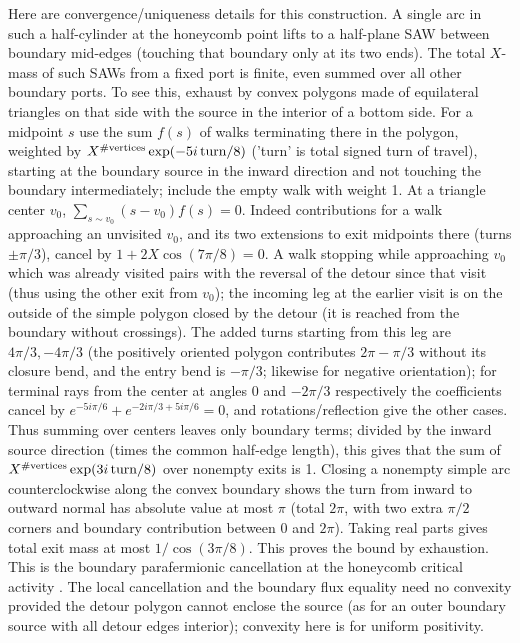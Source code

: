 Here are convergence/uniqueness details for this construction. A single arc in such a half-cylinder at the honeycomb point lifts to a half-plane SAW between boundary mid-edges (touching that boundary only at its two ends). The total \(X\)-mass of such SAWs from a fixed port is finite, even summed over all other boundary ports. To see this, exhaust by convex polygons made of equilateral triangles on that side with the source in the interior of a bottom side. For a midpoint \(s\) use the sum \(f(s)\) of walks terminating there in the polygon, weighted by \(X^{\#\text{vertices}}\exp(-5i\,{\rm turn}/8)\) ('turn' is total signed turn of travel), starting at the boundary source in the inward direction and not touching the boundary intermediately; include the empty walk with weight 1. At a triangle center \(v_0\),
\(\sum_{s\sim v_0}(s-v_0)f(s)=0\).
Indeed contributions for a walk approaching an unvisited \(v_0\), and its two extensions to exit midpoints there (turns \(\pm\pi/3\)), cancel by \(1+2X\cos(7\pi/8)=0\). A walk stopping while approaching \(v_0\) which was already visited pairs with the reversal of the detour since that visit (thus using the other exit from \(v_0\)); the incoming leg at the earlier visit is on the outside of the simple polygon closed by the detour (it is reached from the boundary without crossings). The added turns starting from this leg are \(4\pi/3,-4\pi/3\) (the positively oriented polygon contributes \(2\pi-\pi/3\) without its closure bend, and the entry bend is \(-\pi/3\); likewise for negative orientation); for terminal rays from the center at angles 0 and \(-2\pi/3\) respectively the coefficients cancel by \(e^{-5i\pi/6}+e^{-2i\pi/3+5i\pi/6}=0\), and rotations/reflection give the other cases. Thus summing over centers leaves only boundary terms; divided by the inward source direction (times the common half-edge length), this gives that the sum of \(X^{\#\text{vertices}}\exp(3i\,{\rm turn}/8)\) over nonempty exits is 1. Closing a nonempty simple arc counterclockwise along the convex boundary shows the turn from inward to outward normal has absolute value at most \(\pi\) (total \(2\pi\), with two extra \(\pi/2\) corners and boundary contribution between 0 and \(2\pi\)). Taking real parts gives total exit mass at most \(1/\cos(3\pi/8)\). This proves the bound by exhaustion. This is the boundary parafermionic cancellation at the honeycomb critical activity \cite{DuminilCopinSmirnov2012}. The local cancellation and the boundary flux equality need no convexity provided the detour polygon cannot enclose the source (as for an outer boundary source with all detour edges interior); convexity here is for uniform positivity.

